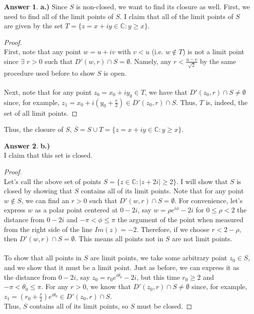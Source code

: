\documentclass[10pt,a4paper]{article}
\theoremstyle{definition}
\newtheorem*{answer*}{Answer}
\begin{document}
\begin{answer*}{\textbf{a.)}}
Since $S$ is non-closed, we want to find its closure as well. First, we need to find all of the limit points of $S$. I claim that all of the limit points of $S$ are given by the set $T = \{z = x + iy \in \mathbb{C} : y \geq x\}$.

\begin{proof}{$ $}
\\First, note that any point $w = u + iv$ with $v < u$ (i.e. $w \notin T$) is not a limit point since $\exists$ $r > 0$ such that $D'(w,r) \cap S = \emptyset$. Namely, any $r < \frac{u - v}{\sqrt{2}}$ by the same procedure used before to show $S$ is open. 
\\
\\Next, note that for any point $z_0 = x_0 + iy_0 \in T$, we have that $D'(z_0,r) \cap S \neq \emptyset$ since, for example, $z_1 = x_0 + i(y_0 + \frac{r}{2}) \in D'(z_0, r) \cap S$. Thus, $T$ is, indeed, the set of all limit points. 
\end{proof}
Thus, the closure of $S$, $\overline{S} = S \cup T = \{z = x + iy \in \mathbb{C} : y \geq x\}$.
\end{answer*}

\begin{answer*}{\textbf{b.)}}
\\I claim that this set is closed.
\begin{proof}{$ $}
\\Let's call the above set of points $S = \{z \in \mathbb{C} : |z + 2i| \geq 2\}$. I will show that $S$ is closed by showing that $S$ contains all of its limit points. Note that for any point $w \notin S$, we can find an $r > 0$ such that $D'(w,r) \cap S = \emptyset$. For convenience, let's express $w$ as a polar point centered at $0 - 2i$, say $w = \rho e^{i\phi} - 2i$ for $0 \leq \rho < 2$ the distance from $0 - 2i$ and $-\pi < \phi \leq \pi$ the argument of the point when measured from the right side of the line $Im(z) = -2$. Therefore, if we choose $r < 2 - \rho$, then $D'(w,r) \cap S = \emptyset$. This means all points not in $S$ are not limit points.\\
\\
To show that all points in $S$ are limit points, we take some arbitrary point $z_0 \in S$, and we show that it must be a limit point. Just as before, we can express it as the distance from $0 - 2i$, say $z_0 = r_0 e^{i\theta_0} - 2i$, but this time $r_0 \geq 2$ and $-\pi < \theta_0 \leq \pi$. For any $r > 0$, we know that $D'(z_0,r) \cap S \neq \emptyset$ since, for example, $z_1 = (r_0 + \frac{r}{2})e^{i\theta_0} \in D'(z_0,r) \cap S$.\\
Thus, $S$ contains all of its limit points, so $S$ must be closed. 
\end{proof}
\end{answer*}
\end{document}
